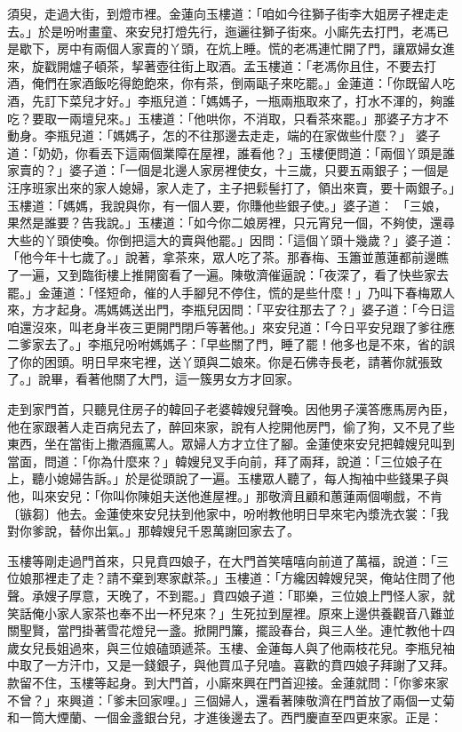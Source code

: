 \begin{showcontents}{}
須臾，走過大街，到燈市裡。金蓮向玉樓道：「咱如今往獅子街李大姐房子裡走走去。」於是吩咐畫童、來安兒打燈先行，迤邐往獅子街來。小廝先去打門，老馮已是歇下，房中有兩個人家賣的丫頭，在炕上睡。慌的老馮連忙開了門，讓眾婦女進來，旋戳開爐子頓茶，挈著壺往街上取酒。孟玉樓道：「老馮你且住，不要去打酒，俺們在家酒飯吃得飽飽來，你有茶，倒兩甌子來吃罷。」金蓮道：「你既留人吃酒，先訂下菜兒才好。」李瓶兒道：「媽媽子，一瓶兩瓶取來了，打水不渾的，夠誰吃？要取一兩壇兒來。」玉樓道：「他哄你，不消取，只看茶來罷。」那婆子方才不動身。李瓶兒道：「媽媽子，怎的不往那邊去走走，端的在家做些什麼？」 婆子道：「奶奶，你看丟下這兩個業障在屋裡，誰看他？」玉樓便問道：「兩個丫頭是誰家賣的？」婆子道：「一個是北邊人家房裡使女，十三歲，只要五兩銀子；一個是汪序班家出來的家人媳婦，家人走了，主子把鬏髻打了，領出來賣，要十兩銀子。」玉樓道：「媽媽，我說與你，有一個人要，你賺他些銀子使。」婆子道： 「三娘，果然是誰要？告我說。」玉樓道：「如今你二娘房裡，只元宵兒一個，不夠使，還尋大些的丫頭使喚。你倒把這大的賣與他罷。」因問：「這個丫頭十幾歲？」婆子道：「他今年十七歲了。」說著，拿茶來，眾人吃了茶。那春梅、玉簫並蕙蓮都前邊瞧了一遍，又到臨街樓上推開窗看了一遍。陳敬濟催逼說：「夜深了，看了快些家去罷。」金蓮道：「怪短命，催的人手腳兒不停住，慌的是些什麼！」乃叫下春梅眾人來，方才起身。馮媽媽送出門，李瓶兒因問：「平安往那去了？」婆子道：「今日這咱還沒來，叫老身半夜三更開門閉戶等著他。」來安兒道：「今日平安兒跟了爹往應二爹家去了。」李瓶兒吩咐媽媽子：「早些關了門，睡了罷！他多也是不來，省的誤了你的困頭。明日早來宅裡，送丫頭與二娘來。你是石佛寺長老，請著你就張致了。」說畢，看著他關了大門，這一簇男女方才回家。

走到家門首，只聽見住房子的韓回子老婆韓嫂兒聲喚。因他男子漢答應馬房內臣，他在家跟著人走百病兒去了，醉回來家，說有人挖開他房門，偷了狗，又不見了些東西，坐在當街上撒酒瘋罵人。眾婦人方才立住了腳。金蓮使來安兒把韓嫂兒叫到當面，問道：「你為什麼來？」韓嫂兒叉手向前，拜了兩拜，說道：「三位娘子在上，聽小媳婦告訴。」於是從頭說了一遍。玉樓眾人聽了，每人掏袖中些錢果子與他，叫來安兒：「你叫你陳姐夫送他進屋裡。」那敬濟且顧和蕙蓮兩個嘲戲，不肯〔镞芻〕他去。金蓮使來安兒扶到他家中，吩咐教他明日早來宅內漿洗衣裳：「我對你爹說，替你出氣。」那韓嫂兒千恩萬謝回家去了。

玉樓等剛走過門首來，只見賁四娘子，在大門首笑嘻嘻向前道了萬福，說道：「三位娘那裡走了走？請不棄到寒家獻茶。」玉樓道：「方纔因韓嫂兒哭，俺站住問了他聲。承嫂子厚意，天晚了，不到罷。」賁四娘子道：「耶樂，三位娘上門怪人家，就笑話俺小家人家茶也奉不出一杯兒來？」生死拉到屋裡。原來上邊供養觀音八難並關聖賢，當門掛著雪花燈兒一盞。掀開門簾，擺設春台，與三人坐。連忙教他十四歲女兒長姐過來，與三位娘磕頭遞茶。玉樓、金蓮每人與了他兩枝花兒。李瓶兒袖中取了一方汗巾，又是一錢銀子，與他買瓜子兒嗑。喜歡的賁四娘子拜謝了又拜。款留不住，玉樓等起身。到大門首，小廝來興在門首迎接。金蓮就問：「你爹來家不曾？」來興道：「爹未回家哩。」三個婦人，還看著陳敬濟在門首放了兩個一丈菊和一筒大煙蘭、一個金盞銀台兒，才進後邊去了。西門慶直至四更來家。正是：


\end{showcontents}

